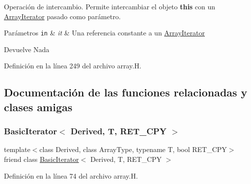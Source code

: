 Operación de intercambio. Permite intercambiar el objeto {\bfseries this} con un \hyperlink{class_designar_1_1_array_iterator}{Array\+Iterator} pasado como parámetro. 


\begin{DoxyParams}[1]{Parámetros}
\mbox{\tt in}  & {\em it} & Una referencia constante a un \hyperlink{class_designar_1_1_array_iterator}{Array\+Iterator} \\
\hline
\end{DoxyParams}
\begin{DoxyReturn}{Devuelve}
Nada 
\end{DoxyReturn}


Definición en la línea 249 del archivo array.\+H.



\subsection{Documentación de las funciones relacionadas y clases amigas}
\mbox{\label{class_designar_1_1_array_iterator_a780ba1bdf8ce9c4f60e364ab9ce0cd47}} 
\subsubsection{\texorpdfstring{Basic\+Iterator$<$ Derived, T, R\+E\+T\+\_\+\+C\+P\+Y $>$}{BasicIterator< Derived, T, RET\_CPY >}}
{\footnotesize\ttfamily template$<$class Derived, class Array\+Type, typename T, bool R\+E\+T\+\_\+\+C\+PY$>$ \\
friend class \hyperlink{class_designar_1_1_basic_iterator}{Basic\+Iterator}$<$ Derived, T, R\+E\+T\+\_\+\+C\+PY $>$\hspace{0.3cm}{\ttfamily [friend]}}



Definición en la línea 74 del archivo array.\+H.

\mbox{\label{class_designar_1_1_array_iterator_af1665f0fe477bd4c26558c3f5cc620c3}} 
